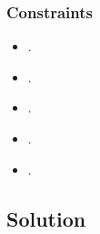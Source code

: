 \documentclass[letterpaper,12pt,english]{book}
\begin{document}
\subsubsection{Constraints}
\label{\detokenize{Array/01_ARR_867_Transpose_Matrix:constraints}}\begin{itemize}
\item {} 
\sphinxAtStartPar
{}.

\item {} 
\sphinxAtStartPar
{}.

\item {} 
\sphinxAtStartPar
{}.

\item {} 
\sphinxAtStartPar
{}.

\item {} 
\sphinxAtStartPar
{}.

\end{itemize}


\subsection{Solution}
\label{\detokenize{Array/01_ARR_867_Transpose_Matrix:solution}}
\end{document}
